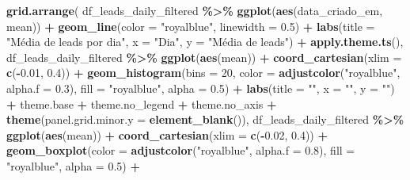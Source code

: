 \documentclass[
]{article}
\newenvironment{Shaded}{\begin{snugshade}}{\end{snugshade}}
\newcommand{\AttributeTok}[1]{\textcolor[rgb]{0.13,0.29,0.53}{#1}}
\newcommand{\DecValTok}[1]{\textcolor[rgb]{0.00,0.00,0.81}{#1}}
\newcommand{\FloatTok}[1]{\textcolor[rgb]{0.00,0.00,0.81}{#1}}
\newcommand{\FunctionTok}[1]{\textcolor[rgb]{0.13,0.29,0.53}{\textbf{#1}}}
\newcommand{\NormalTok}[1]{#1}
\newcommand{\SpecialCharTok}[1]{\textcolor[rgb]{0.81,0.36,0.00}{\textbf{#1}}}
\newcommand{\StringTok}[1]{\textcolor[rgb]{0.31,0.60,0.02}{#1}}
\begin{document}
\begin{Shaded}
\begin{Highlighting}[]
\FunctionTok{grid.arrange}\NormalTok{(}
\NormalTok{  df\_leads\_daily\_filtered }\SpecialCharTok{\%\textgreater{}\%}
    \FunctionTok{ggplot}\NormalTok{(}\FunctionTok{aes}\NormalTok{(data\_criado\_em, mean)) }\SpecialCharTok{+}
    \FunctionTok{geom\_line}\NormalTok{(}\AttributeTok{color =} \StringTok{"royalblue"}\NormalTok{, }\AttributeTok{linewidth =} \FloatTok{0.5}\NormalTok{) }\SpecialCharTok{+}
    \FunctionTok{labs}\NormalTok{(}\AttributeTok{title =} \StringTok{"Média de leads por dia"}\NormalTok{,}
         \AttributeTok{x =} \StringTok{"Dia"}\NormalTok{,}
         \AttributeTok{y =} \StringTok{"Média de leads"}\NormalTok{) }\SpecialCharTok{+}
    \FunctionTok{apply.theme.ts}\NormalTok{(),}
\NormalTok{  df\_leads\_daily\_filtered }\SpecialCharTok{\%\textgreater{}\%}
    \FunctionTok{ggplot}\NormalTok{(}\FunctionTok{aes}\NormalTok{(mean)) }\SpecialCharTok{+}
    \FunctionTok{coord\_cartesian}\NormalTok{(}\AttributeTok{xlim =} \FunctionTok{c}\NormalTok{(}\SpecialCharTok{{-}}\FloatTok{0.01}\NormalTok{, }\FloatTok{0.4}\NormalTok{)) }\SpecialCharTok{+}
    \FunctionTok{geom\_histogram}\NormalTok{(}\AttributeTok{bins =} \DecValTok{20}\NormalTok{, }\AttributeTok{color =} \FunctionTok{adjustcolor}\NormalTok{(}\StringTok{"royalblue"}\NormalTok{, }\AttributeTok{alpha.f =} \FloatTok{0.3}\NormalTok{), }\AttributeTok{fill =} \StringTok{"royalblue"}\NormalTok{, }\AttributeTok{alpha =} \FloatTok{0.5}\NormalTok{) }\SpecialCharTok{+}
    \FunctionTok{labs}\NormalTok{(}\AttributeTok{title =} \StringTok{""}\NormalTok{,}
         \AttributeTok{x =} \StringTok{""}\NormalTok{,}
         \AttributeTok{y =} \StringTok{""}\NormalTok{) }\SpecialCharTok{+}
\NormalTok{    theme.base }\SpecialCharTok{+}\NormalTok{ theme.no\_legend }\SpecialCharTok{+}\NormalTok{ theme.no\_axis }\SpecialCharTok{+}
    \FunctionTok{theme}\NormalTok{(}\AttributeTok{panel.grid.minor.y =} \FunctionTok{element\_blank}\NormalTok{()),}
\NormalTok{  df\_leads\_daily\_filtered }\SpecialCharTok{\%\textgreater{}\%}
    \FunctionTok{ggplot}\NormalTok{(}\FunctionTok{aes}\NormalTok{(mean)) }\SpecialCharTok{+}
    \FunctionTok{coord\_cartesian}\NormalTok{(}\AttributeTok{xlim =} \FunctionTok{c}\NormalTok{(}\SpecialCharTok{{-}}\FloatTok{0.02}\NormalTok{, }\FloatTok{0.4}\NormalTok{)) }\SpecialCharTok{+}
    \FunctionTok{geom\_boxplot}\NormalTok{(}\AttributeTok{color =} \FunctionTok{adjustcolor}\NormalTok{(}\StringTok{"royalblue"}\NormalTok{, }\AttributeTok{alpha.f =} \FloatTok{0.8}\NormalTok{), }\AttributeTok{fill =} \StringTok{"royalblue"}\NormalTok{, }\AttributeTok{alpha =} \FloatTok{0.5}\NormalTok{) }\SpecialCharTok{+}

\end{Highlighting}
\end{Shaded}
\end{document}
